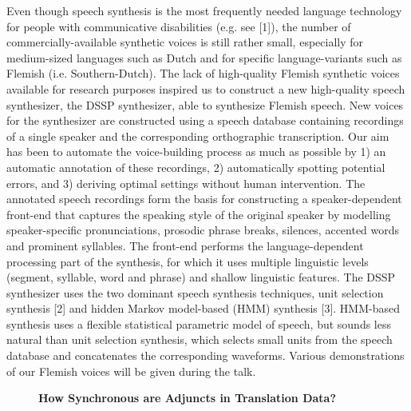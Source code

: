 \documentclass[10pt, a4paper, twopage, headinclude, footinclude, BCOR5mm]{book}
\begin{document}
Even though speech synthesis is the most frequently needed language technology for people with communicative disabilities (e.g. see [1]), the number of commercially-available synthetic voices is still rather small, especially for medium-sized languages such as Dutch and for specific language-variants such as Flemish (i.e. Southern-Dutch). The lack of high-quality Flemish synthetic voices available for research purposes inspired us to construct a new high-quality speech synthesizer, the DSSP synthesizer, able to synthesize Flemish speech.  New voices for the synthesizer are constructed using a speech database containing recordings of a single speaker and the corresponding orthographic transcription. Our aim has been to automate the voice-building process as much as possible by 1) an automatic annotation of these recordings, 2) automatically spotting potential errors, and 3) deriving optimal settings without human intervention. The annotated speech recordings form the basis for constructing a speaker-dependent front-end that captures the speaking style of the original speaker by modelling speaker-specific pronunciations, prosodic phrase breaks, silences, accented words and prominent syllables. The front-end performs the language-dependent processing part of the synthesis, for which it uses multiple linguistic levels (segment, syllable, word and phrase) and shallow linguistic features. The DSSP synthesizer uses the two dominant speech synthesis techniques, unit selection synthesis [2] and hidden Markov model-based (HMM) synthesis [3]. HMM-based synthesis uses a flexible statistical parametric model of speech, but sounds less natural than unit selection synthesis, which selects small units from the speech database and concatenates the corresponding waveforms. Various demonstrations of our Flemish voices will be given during the talk.    

\newpage

\begin{figure}[t!]
\centering
\large\textbf{How Synchronous are Adjuncts in Translation Data?}
\vspace*{0.5cm}
\end{figure}
\end{document}
